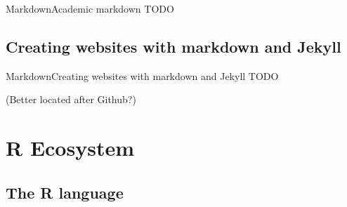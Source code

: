 \documentclass{beamer}
\begin{document}


\begin{frame}{Markdown}{Academic markdown}
	TODO
\end{frame}


\subsection{Creating websites with markdown and Jekyll}



\begin{frame}{Markdown}{Creating websites with markdown and Jekyll}
	TODO

	(Better located after Github?)
\end{frame}





\section{R Ecosystem}


\subsection[R language]{The R language}

\end{document}
